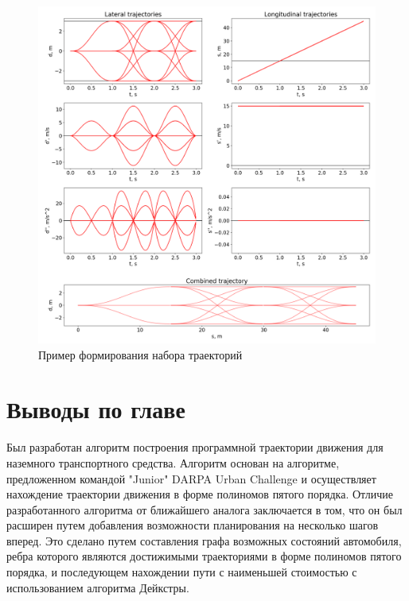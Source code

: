 \begin{figure}[h]
      \centering
      \includegraphics[width=\linewidth]{images/2_project/quintic_2/multistep_trajectories}
            \caption{Пример формирования набора траекторий}
      \label{img:multistep_trajectories}
\end{figure}

\section{Выводы по главе}
Был разработан алгоритм построения программной траектории движения для наземного транспортного средства.
Алгоритм основан на алгоритме, предложенном командой "Junior" DARPA Urban Challenge \cite{darpa_junior} и осуществляет
нахождение траектории движения в форме полиномов пятого порядка.
Отличие разработанного алгоритма от ближайшего аналога заключается в том, что он был расширен путем добавления
возможности планирования на несколько шагов вперед. Это сделано путем составления графа возможных состояний
автомобиля, ребра которого являются достижимыми траекториями в форме полиномов пятого порядка, и последующем нахождении
пути с наименьшей стоимостью с использованием алгоритма Дейкстры.


